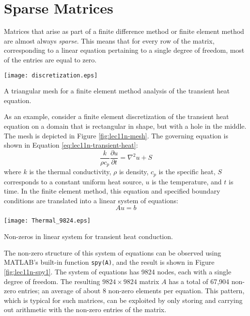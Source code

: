 \section{Sparse Matrices}

Matrices that arise as part of a finite difference method or finite element method are almost always \emph{sparse}.  This means that for every row of the matrix, corresponding to a linear equation pertaining to a single degree of freedom, most of the entries are equal to zero.  

\begin{marginfigure}[-3.75cm]
\texttt{[image: discretization.eps]}
\caption{A triangular mesh for a finite element method analysis of the transient heat equation.}
\label{fig:lec11n-mesh}
\end{marginfigure}
As an example, consider a finite element discretization of the transient heat equation on a domain that is rectangular in shape, but with a hole in the middle.  The mesh is depicted in Figure \ref{fig:lec11n-mesh}. The governing equation is shown in Equation \ref{eq:lec11n-transient-heat}:
\begin{equation}
\frac{k}{\rho c_p}\frac{\partial u}{\partial t} = \nabla^2 u + S
\label{eq:lec11n-transient-heat}
\end{equation}
where $k$ is the thermal conductivity, $\rho$ is density, $c_p$ is the specific heat, $S$ corresponds to a constant uniform heat source, $u$ is the temperature, and $t$ is time. In the finite element method, this equation and specified boundary conditions are translated into a linear system of equations:
\begin{equation*}
Au = b
\end{equation*} 
\begin{marginfigure}[-6.0cm]
\texttt{[image: Thermal\_9824.eps]}
\caption{Non-zeros in linear system for transient heat conduction.}
\label{fig:lec11n-spy1}
\end{marginfigure}
The non-zero structure of this system of equations can be observed using MATLAB's built-in function \lstinline[style=myMatlab]{spy(A)}, and the result is shown in Figure \ref{fig:lec11n-spy1}. The system of equations has 9824 nodes, each with a single degree of freedom.  The resulting $9824 \times 9824$ matrix $A$ has a total of 67,904 non-zero entries; an average of about 8 non-zero elements per equation. This pattern, which is typical for such matrices, can be exploited by only storing and carrying out arithmetic with the non-zero entries of the matrix.  

